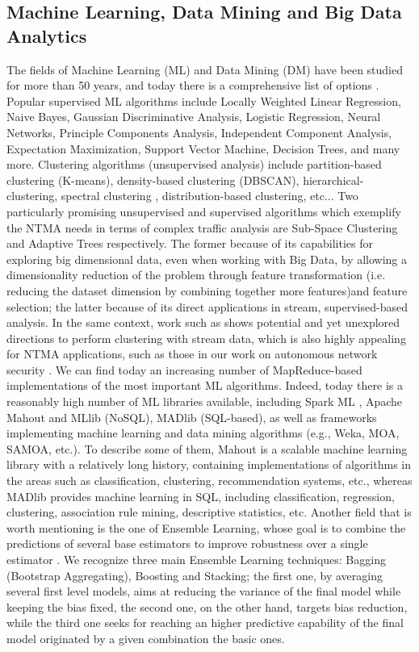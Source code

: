 \documentclass[10pt, conference, letterpaper]{IEEEtran}
\begin{document}
\subsection{Machine Learning, Data Mining and Big Data Analytics}

The fields of Machine Learning (ML) and Data Mining (DM) have been studied for more than 50 years, and today there is a comprehensive list of options \cite{bishop}. Popular supervised ML algorithms include Locally Weighted Linear Regression, Naive Bayes, Gaussian Discriminative Analysis, Logistic Regression, Neural Networks, Principle Components Analysis, Independent Component Analysis, Expectation Maximization, Support Vector Machine, Decision Trees, and many more. Clustering algorithms (unsupervised analysis) \cite{ml_1} include partition-based clustering (K-means), density-based clustering (DBSCAN), hierarchical-clustering, spectral clustering \cite{ml_3}, distribution-based clustering, etc... Two particularly promising unsupervised and supervised algorithms which exemplify the NTMA needs in terms of complex traffic analysis are Sub-Space Clustering \cite{ml_2} and Adaptive Trees \cite{fast_trees_1, fast_trees_2} respectively. The former because of its capabilities for exploring big dimensional data, even when working with Big Data, by allowing a dimensionality reduction of the problem through feature transformation (i.e. reducing the dataset dimension by combining together more features)and feature selection; the latter because of its direct applications in stream, supervised-based analysis. In the same context, work such as \cite{ml_4} shows potential and yet unexplored directions to perform clustering with stream data, which is also highly appealing for NTMA applications, such as those in our work on autonomous network security \cite{casas2012}. We can find today an increasing number of MapReduce-based implementations of the most important ML algorithms. Indeed, today there is a reasonably high number of ML libraries available, including Spark ML \cite{sparkml},  Apache Mahout \cite{mahout} and MLlib \cite{MLlib} (NoSQL), MADlib (SQL-based), as well as frameworks implementing machine learning and data mining algorithms (e.g., Weka, MOA, SAMOA, etc.). To describe some of them, Mahout is a scalable machine learning library with a relatively long history, containing implementations of algorithms in the areas such as classification, clustering, recommendation systems, etc., whereas MADlib provides machine learning in SQL, including classification, regression, clustering, association rule mining, descriptive statistics, etc. Another field that  is worth mentioning is the one of Ensemble Learning, whose goal is to combine the predictions of several base estimators to improve robustness over a single estimator \cite{sklearn}. We recognize three main Ensemble Learning techniques: Bagging (Bootstrap Aggregating), Boosting and Stacking; the first one, by averaging several first level models, aims at reducing the variance of the final model while keeping the bias fixed, the second one, on the other hand, targets bias reduction, while the third one seeks for reaching an higher predictive capability of the final model originated by a given combination the basic ones. 
\end{document}
